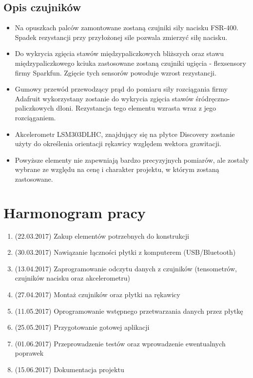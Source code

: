 \documentclass[12pt,a4paper]{article}
\begin{document}
\subsection{Opis czujników}
\begin{itemize}
\item Na opuszkach palców zamontowane zostaną czujniki siły nacisku FSR-400. Spadek rezystancji przy przyłożonej sile pozwala zmierzyć siłę nacisku.
\item Do wykrycia zgięcia stawów międzypaliczkowych bliższych oraz stawu międzypaliczkowego kciuka zastosowane zostaną czujniki ugięcia - flexsensory firmy Sparkfun. Zgięcie tych sensorów powoduje wzrost rezystancji.
\item Gumowy przewód przewodzący prąd do pomiaru siły rozciągania firmy Adafruit wykorzystany zostanie do wykrycia zgięcia stawów śródręczno-paliczkowych dłoni. Rezystancja tego elementu wzrasta wraz z jego rozciąganiem.
\item Akcelerometr LSM303DLHC, znajdujący się na płytce Discovery zostanie użyty do określenia orientacji rękawicy względem wektora grawitacji.
\item Powyższe elementy nie zapewniają bardzo precyzyjnych pomiarów, ale zostały wybrane ze względu na cenę i charakter projektu, w którym zostaną zastosowane.
\end{itemize}
\section{Harmonogram pracy}
\begin{enumerate}
\item (22.03.2017) Zakup elementów potrzebnych do konstrukcji 
\item (30.03.2017) Nawiązanie łączności płytki z komputerem (USB/Bluetooth) 
\item (13.04.2017) Zaprogramowanie odczytu danych z czujników (tensometrów, czujników nacisku oraz akcelerometru) 
\item (27.04.2017) Montaż czujników oraz płytki na rękawicy 
\item (11.05.2017) Oprogramowanie wstępnego przetwarzania danych przez płytkę 
\item (25.05.2017) Przygotowanie gotowej aplikacji 
\item (01.06.2017) Przeprowadzenie testów oraz wprowadzenie ewentualnych poprawek 
\item (15.06.2017) Dokumentacja projektu 
\end{enumerate}
\end{document}
